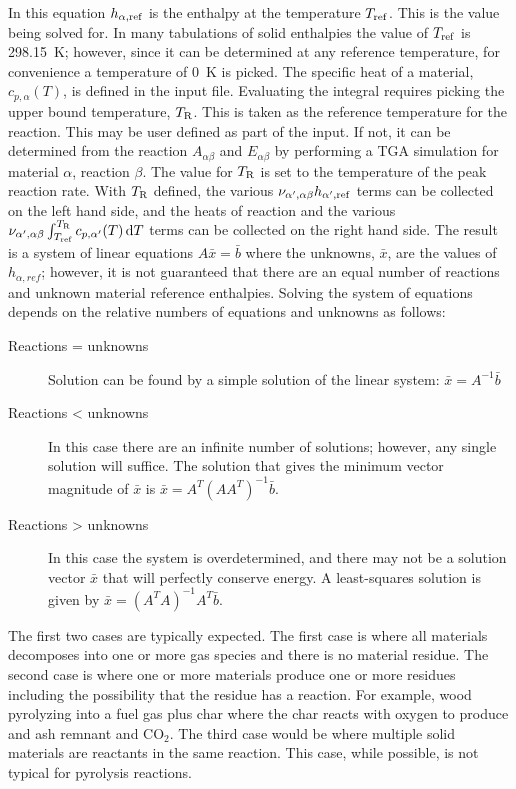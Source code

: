 In this equation $h_{\alpha,{\rm ref}}$ is the enthalpy at the temperature $T_{\rm ref}$. This is the value being solved for. In many tabulations of solid enthalpies the value of $T_{\rm ref}$ is 298.15~K; however, since it can be determined at any reference temperature, for convenience a temperature of 0~K is picked. The specific heat of a material, $c_{p,\alpha}(T)$, is defined in the input file. Evaluating the integral requires picking the upper bound temperature, $T_{\rm R}$. This is taken as the reference temperature for the reaction. This may be user defined as part of the input. If not, it can be determined from the reaction $A_{\alpha\beta}$ and $E_{\alpha\beta}$ by performing a TGA simulation for material $\alpha$, reaction $\beta$. The value for $T_{\rm R}$ is set to the temperature of the peak reaction rate. With $T_{\rm R}$ defined, the various $\nu_{\alpha',\alpha \beta} h_{\alpha',{\rm ref}}$ terms can be collected on the left hand side, and the heats of reaction and the various $\nu_{\alpha',\alpha \beta} \int_{T_{\rm ref}}^{T_{\rm R}} c_{p,\alpha'}(T) \, \mbox{d}T$ terms can be collected on the right hand side. The result is a system of linear equations $A \bar{x} = \bar{b}$ where the unknowns, $\bar{x}$, are the values of $h_{\alpha,ref}$; however, it is not guaranteed that there are an equal number of reactions and unknown material reference enthalpies. Solving the system of equations depends on the relative numbers of equations and unknowns as follows:

\begin{description}
   \item[Reactions = unknowns]{Solution can be found by a simple solution of the linear system: $\bar{x} = A^{-1} \bar{b}$}
   \item[Reactions < unknowns]{In this case there are an infinite number of solutions; however, any single solution will suffice. The solution that gives the minimum vector magnitude of $\bar{x}$ is $\bar{x}= A^T (A A^T)^{-1} \bar{b}$.}
   \item[Reactions > unknowns]{In this case the system is overdetermined, and there may not be a solution vector $\bar{x}$ that will perfectly conserve energy. A least-squares solution is given by $\bar{x}=  (A^T A)^{-1} A^T \bar{b}$.}
\end{description}
The first two cases are typically expected. The first case is where all materials decomposes into one or more gas species and there is no material residue. The second case is where one or more materials produce one or more residues including the possibility that the residue has a reaction. For example, wood pyrolyzing into a fuel gas plus char where the char reacts with oxygen to produce and ash remnant and CO$_2$. The third case would be where multiple solid materials are reactants in the same reaction. This case, while possible, is not typical for pyrolysis reactions.

